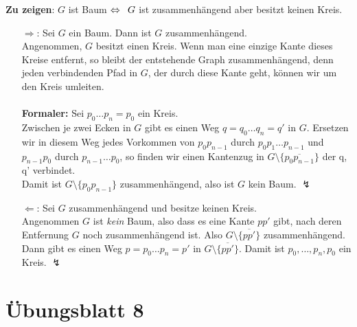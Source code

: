 \begin{problem}[4]
  \textbf{Zu zeigen}: \( G \) ist Baum \( \Leftrightarrow \enskip G \) ist zusammenhängend aber besitzt keinen Kreis.
  \begin{itemize}
    \item[\( \Rightarrow \):] Sei \( G \) ein Baum. Dann ist \( G \) zusammenhängend. \\
    Angenommen, \( G \) besitzt einen Kreis. Wenn man eine einzige Kante dieses Kreise entfernt, so bleibt der entstehende Graph zusammenhängend, denn jeden verbindenden Pfad in \( G \), der durch diese Kante geht, können wir um den Kreis umleiten. \\ 
    \\
    \textbf{Formaler:} Sei \( p_0 \dots p_n = p_0 \) ein Kreis. \\
    Zwischen je zwei Ecken in \( G \) gibt es einen Weg \( q = q_0 \dots q_n = q' \) in \( G \). Ersetzen wir in diesem Weg jedes Vorkommen von \( p_0p_{n-1} \) durch \( p_0p_1 \dots p_{n-1} \) und \( p_{n-1}p_0 \) durch \( p_{n-1} \dots p_0 \), so finden wir einen Kantenzug in \( G \setminus \{ \overline{p_0p_{n-1}} \} \) der q, q' verbindet. \\
    Damit ist \( G \setminus \{ p_0p_{n-1} \} \) zusammenhängend, also ist \( G \) kein Baum. \quad \( \lightning \)

    \item[\( \Leftarrow \):] Sei \( G \) zusammenhängend und besitze keinen Kreis. \\
    Angenommen \( G \) ist \emph{kein} Baum, also dass es eine Kante \( pp' \) gibt, nach deren Entfernung \( G \) noch zusammenhängend ist. Also \( G \setminus \{ \overline{pp'} \} \) zusammenhängend. \\
    Dann gibt es einen Weg \( p = p_0 \dots p_n = p' \) in \( G \setminus \{ \overline{pp'} \} \). Damit ist \( p_0, \dots, p_n, p_0 \) ein Kreis. \quad \( \lightning \)
  \end{itemize}  
\end{problem}



%
\section{Übungsblatt 8}

